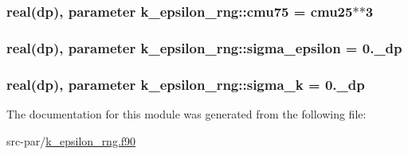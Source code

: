 \hypertarget{classk__epsilon__rng_aa8cce766b4ed7f38a8e55945cee9c659}{
\subsubsection[{cmu75}]{\setlength{\rightskip}{0pt plus 5cm}real(dp), parameter k\-\_\-epsilon\-\_\-rng\-::cmu75 = {\bf cmu25}$\ast$$\ast$3}}\label{classk__epsilon__rng_aa8cce766b4ed7f38a8e55945cee9c659}
\hypertarget{classk__epsilon__rng_ad605a3725a59c2b4c42212222e9b8f0e}{
\subsubsection[{sigma\-\_\-epsilon}]{\setlength{\rightskip}{0pt plus 5cm}real(dp), parameter k\-\_\-epsilon\-\_\-rng\-::sigma\-\_\-epsilon = 0.\-\_\-dp}}\label{classk__epsilon__rng_ad605a3725a59c2b4c42212222e9b8f0e}
\hypertarget{classk__epsilon__rng_a5acd8d27794527d80376d8dc66a15c80}{
\subsubsection[{sigma\-\_\-k}]{\setlength{\rightskip}{0pt plus 5cm}real(dp), parameter k\-\_\-epsilon\-\_\-rng\-::sigma\-\_\-k = 0.\-\_\-dp}}\label{classk__epsilon__rng_a5acd8d27794527d80376d8dc66a15c80}


The documentation for this module was generated from the following file\-:\begin{DoxyCompactItemize}
\item 
src-\/par/\hyperlink{k__epsilon__rng_8f90}{k\-\_\-epsilon\-\_\-rng.\-f90}\end{DoxyCompactItemize}

